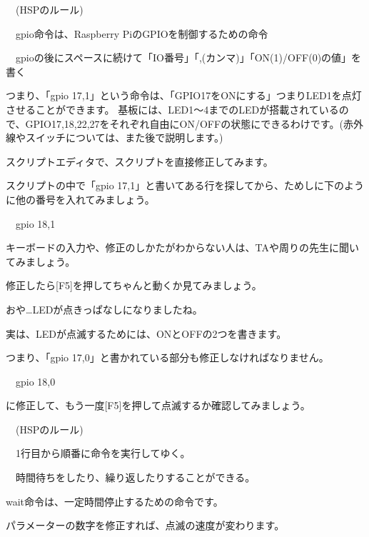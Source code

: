 \documentclass[a4paper,12pt]{jarticle}
\begin{document}
\bigskip

\ \ (HSPのルール)


\bigskip

\ \ gpio命令は、Raspberry PiのGPIOを制御するための命令

\ \ gpioの後にスペースに続けて「IO番号」「,(カンマ)」「ON(1)/OFF(0)の値」を書く


\bigskip

\bigskip

つまり、「gpio 17,1」という命令は、「GPIO17をONにする」つまりLED1を点灯させることができます。
基板には、LED1〜4までのLEDが搭載されているので、GPIO17,18,22,27をそれぞれ自由にON/OFFの状態にできるわけです。(赤外線やスイッチについては、また後で説明します。)


\bigskip

スクリプトエディタで、スクリプトを直接修正してみます。

スクリプトの中で「gpio 17,1」と書いてある行を探してから、ためしに下のように他の番号を入れてみましょう。


\bigskip

\ \ gpio 18,1


\bigskip


\bigskip

キーボードの入力や、修正のしかたがわからない人は、TAや周りの先生に聞いてみましょう。


\bigskip

修正したら[F5]を押してちゃんと動くか見てみましょう。

おや…LEDが点きっぱなしになりましたね。

実は、LEDが点滅するためには、ONとOFFの2つを書きます。

つまり、「gpio 17,0」と書かれている部分も修正しなければなりません。


\bigskip

\ \ gpio 18,0


\bigskip

に修正して、もう一度[F5]を押して点滅するか確認してみましょう。


\bigskip

\ \ (HSPのルール)


\bigskip

\ \ 1行目から順番に命令を実行してゆく。

\ \ 時間待ちをしたり、繰り返したりすることができる。


\bigskip

wait命令は、一定時間停止するための命令です。

パラメーターの数字を修正すれば、点滅の速度が変わります。
\end{document}
